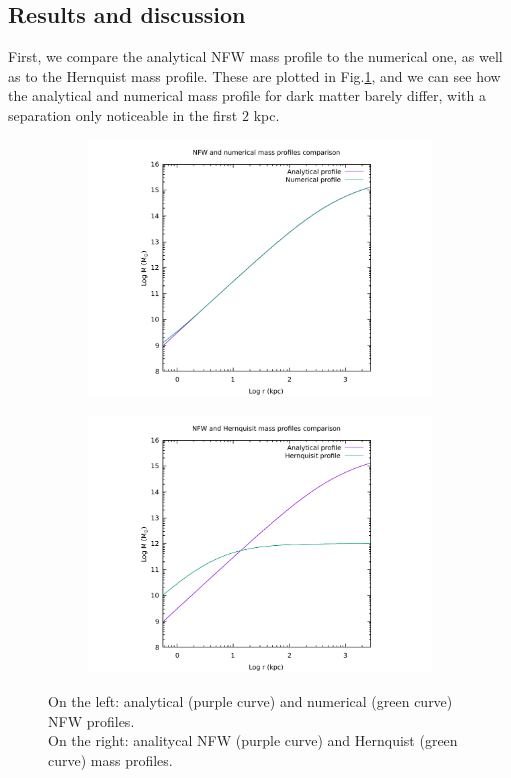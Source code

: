 \documentclass{article}
\begin{document}
\subsection{Results and discussion}
First, we compare the analytical NFW mass profile to the numerical one, as well as to the Hernquist mass profile. These are plotted in Fig.\ref{fig:massprofiles}, and we can see how the analytical and numerical mass profile for dark matter barely differ, with a separation only noticeable in the first $2$ kpc.
\begin{figure}[H]
	
	\begin{subfigure}{0.49\textwidth}
		\includegraphics[width=1\linewidth]{dm_mass_profile.pdf}
	\end{subfigure}
	\begin{subfigure}{0.49\textwidth}
		\includegraphics[width=1\linewidth]{mass_profiles.pdf}
	\end{subfigure}
	\centering
	\caption{On the left: analytical (purple curve) and numerical (green curve) NFW profiles. \\On the right: analitycal NFW (purple curve) and Hernquist (green curve) mass profiles.}
	\label{fig:massprofiles}
\end{figure}
\end{document}
